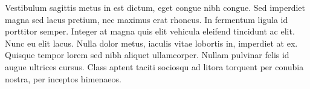 Vestibulum sagittis metus in est dictum, eget congue nibh congue. Sed imperdiet magna sed lacus pretium, nec maximus erat rhoncus. In fermentum ligula id porttitor semper. Integer at magna quis elit vehicula eleifend tincidunt ac elit. Nunc eu elit lacus. Nulla dolor metus, iaculis vitae lobortis in, imperdiet at ex. Quisque tempor lorem sed nibh aliquet ullamcorper. Nullam pulvinar felis id augue ultrices cursus. Class aptent taciti sociosqu ad litora torquent per conubia nostra, per inceptos himenaeos.